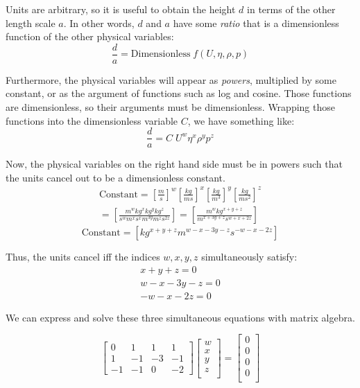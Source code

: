 \documentclass[12pt, a4paper, twoside, openright]{book}
\begin{document}
Units are arbitrary, so it is useful to obtain the height $d$ in terms of the other length scale $a$.  In other words, $d$ and $a$ have some \emph{ratio} that is a dimensionless function of the other physical variables:
\begin{equation}
\frac{d}{a} = \text{Dimensionless} \; f(U, \eta, \rho, p)
\end{equation}

Furthermore, the physical variables will appear as \emph{powers}, multiplied by some constant, or as the argument of functions such as log and cosine.  Those functions are dimensionless, so their arguments must be dimensionless.  Wrapping those functions into the dimensionless variable $C$, we have something like:
\begin{equation}
\frac{d}{a} = C \; U^{w} \eta^{x} \rho^{y} p^{z}
\end{equation}

Now, the physical variables on the right hand side must be in powers such that the units cancel out to be a dimensionless constant.
\begin{gather*}
\text{Constant} = \left[ \frac{m}{s} \right]^{w} \left[ \frac{kg}{ms} \right]^{x}
\left[ \frac{kg}{m^{3}} \right]^{y} \left[ \frac{kg}{m s^{2}} \right]^{z} \\
 = \left[ \frac{m^{w} kg^{x} kg^{y} kg^{z}}{s^{w} m^{x} s^{x} m^{3y} m^{z} s^{2z}} \right] 
 = \left[ \frac{m^{w} kg^{x+y+z}}{m^{x+3y+z} s^{w+x+2z}} \right]
\end{gather*}
\begin{equation}
\text{Constant} = \left[ kg^{x+y+z} m^{w-x-3y-z} s^{-w-x-2z} \right] 
\end{equation}

Thus, the units cancel iff the indices $w,x,y,z$ simultaneously satisfy:
\begin{align}
x+y+z = 0 \\ w-x-3y-z = 0 \\ -w-x-2z = 0 
\end{align}

We can express and solve these three simultaneous equations with matrix algebra.

\begin{equation}
 \begin{bmatrix}
0  &  1 & 1  &  1 \\
1  & -1 & -3 & -1 \\
-1 & -1 & 0  & -2
\end{bmatrix}
\begin{bmatrix}
w \\ x \\ y \\ z \\
\end{bmatrix}
=
\begin{bmatrix}
0 \\ 0 \\ 0 \\ 0 \\
\end{bmatrix}
\end{equation}
\end{document}
